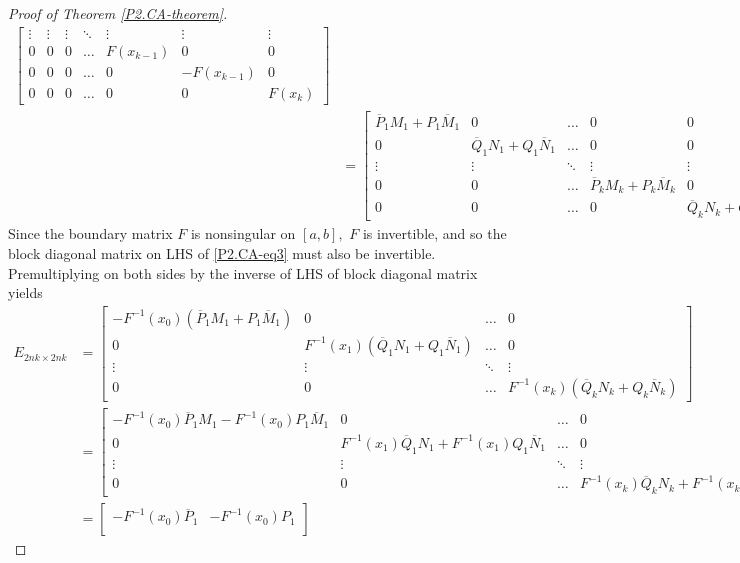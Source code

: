 \documentclass[10pt,reqno,oneside,a4paper]{article}
\begin{document}
\begin{proof}[Proof of Theorem \ref{P2.CA-theorem}]
\begin{equation}
\begin{aligned}
\begin{bmatrix}
\vdots & \vdots & \vdots & \ddots & \vdots & \vdots & \vdots  \\
0 &  0 & 0 & \ldots & F(x_{k-1}) & 0 & 0 \\
0 &  0 & 0 & \ldots & 0 & -F(x_{k-1}) & 0 \\
0 &  0 & 0 & \ldots & 0 & 0 & F(x_{k}) 
\end{bmatrix} \\
&= 
\begin{bmatrix} 
\overline{P}_1M_1 + P_1\overline{M}_1 & 0 & \ldots & 0 & 0 \\
0 & \overline{Q}_1 N_1 + Q_1\overline{N}_1 & \ldots & 0 & 0 \\
\vdots & \vdots & \ddots & \vdots & \vdots  \\
0 &  0 & \ldots & \overline{P}_k M_k + P_k \overline{M}_k & 0 \\
0 &  0 & \ldots & 0 & \overline{Q}_k N_k + Q_k\overline{N}_k 
\end{bmatrix}.
\end{aligned}
\end{equation}
Since the boundary matrix $F$ is nonsingular on $[a,b],$ $F$ is invertible, and so the block diagonal matrix on LHS of \eqref{P2.CA-eq3} must also be invertible. Premultiplying on both sides by the inverse of LHS of block diagonal matrix yields 
\begin{align}
E_{2nk\times2nk} &= 
\begin{bmatrix} 
- F^{-1}(x_0)(\overline{P}_1M_1 + P_1\overline{M}_1) & 0 & \ldots & 0 \\
0 & F^{-1}(x_1)(\overline{Q}_1N_1 + Q_1 \overline{N}_1) & \ldots & 0 \\
\vdots & \vdots & \ddots & \vdots  \\
0 & 0 & \ldots & F^{-1}(x_{k})(\overline{Q}_k N_k + Q_k\overline{N}_k)
\end{bmatrix} \nonumber \\
&= 
\begin{bmatrix} 
- F^{-1}(x_0)\overline{P}_1M_1 - F^{-1}(x_0) P_1\overline{M}_1 & 0 & \ldots & 0 \\
0 & F^{-1}(x_1)\overline{Q}_1N_1 + F^{-1}(x_1) Q_1 \overline{N}_1 & \ldots & 0\\
\vdots & \vdots & \ddots & \vdots  \\
0 & 0 & \ldots & F^{-1}(x_{k})\overline{Q}_k N_k + F^{-1}(x_{k})Q_k\overline{N}_k
\end{bmatrix} \nonumber \\
&= 
\begin{bmatrix} 
- F^{-1}(x_0)\overline{P}_1 & - F^{-1}(x_0) P_1 \\

\end{bmatrix}
\end{align}
\end{proof}
\end{document}
